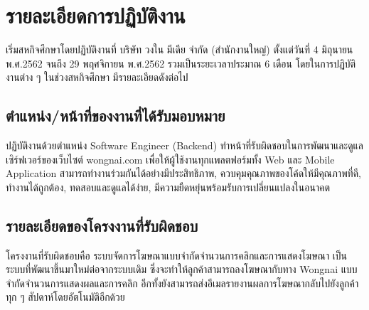 \chapter{รายละเอียดการปฏิบัติงาน}
\label{chapter:related-theory}

เริ่มสหกิจศึกษาโดยปฏิบัติงานที่ บริษัท วงใน มีเดีย จำกัด (สำนักงานใหญ่) ตั้งแต่วันที่ 4 มิถุนายน พ.ศ.2562 จนถึง 29 พฤศจิกายน พ.ศ.2562 รวมเป็นระยะเวลาประมาณ 6 เดือน โดยในการปฏิบัติงานต่าง ๆ ในช่วงสหกิจศึกษา มีรายละเอียดดังต่อไป

\section{ตำแหน่ง/หน้าที่ของงานที่ได้รับมอบหมาย}
ปฏิบัติงานด้วยตำแหน่ง Software Engineer (Backend) ทำหน้าที่รับผิดชอบในการพัฒนาและดูแลเซิร์ฟเวอร์ของเว็บไซต์ wongnai.com เพื่อให้ผู้ใช้งานทุกแพลตฟอร์มทั้ง  Web และ Mobile Application สามารถทำงานร่วมกันได้อย่างมีประสิทธิภาพ, ควบคุมคุณภาพของโค้ดให้มีคุณภาพที่ดี, ทำงานได้ถูกต้อง, ทดสอบและดูแลได้ง่าย, มีความยืดหยุ่นพร้อมรับการเปลี่ยนแปลงในอนาคต

\section{รายละเอียดของโครงงานที่รับผิดชอบ}
โครงงานที่รับผิดชอบคือ ระบบจัดการโฆษณาแบบจำกัดจำนวนการคลิกและการแสดงโฆษณา เป็นระบบที่พัฒนาขึ้นมาใหม่ต่อจากระบบเดิม ซึ่งจะทำให้ลูกค้าสามารถลงโฆษณากับทาง Wongnai แบบจำกัดจำนวนการแสดงผลและการคลิก อีกทั้งยังสามารถส่งอีเมลรายงานผลการโฆษณากลับไปยังลูกค้าทุก ๆ สัปดาห์โดยอัตโนมัติอีกด้วย

